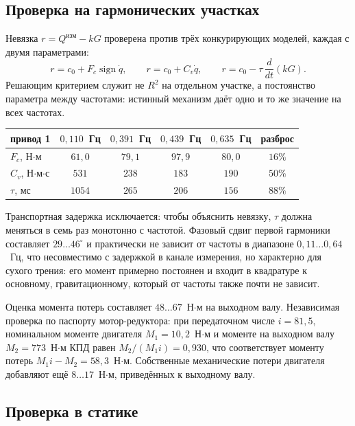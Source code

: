 \subsection{Проверка на гармонических участках}

Невязка $r = Q^{\text{изм}} - kG$ проверена против трёх конкурирующих моделей, каждая с двумя параметрами:
\begin{equation}
r = c_0 + F_c\operatorname{sign}\dot{q}, \qquad
r = c_0 + C_v\dot{q}, \qquad
r = c_0 - \tau\,\frac{d}{dt}\left(kG\right).
\end{equation}
Решающим критерием служит не $R^2$ на отдельном участке, а постоянство параметра между частотами: истинный механизм даёт одно и то же значение на всех частотах.

\begin{center}
\begin{tabular}{l|cccc|c}
привод 1 & $0{,}110$~Гц & $0{,}391$~Гц & $0{,}439$~Гц & $0{,}635$~Гц & разброс\\
\hline
$F_c$, Н$\cdot$м & $61{,}0$ & $79{,}1$ & $97{,}9$ & $80{,}0$ & $16\%$\\
$C_v$, Н$\cdot$м$\cdot$с & $531$ & $238$ & $183$ & $190$ & $50\%$\\
$\tau$, мс & $1054$ & $265$ & $206$ & $156$ & $88\%$\\
\end{tabular}
\end{center}

Транспортная задержка исключается: чтобы объяснить невязку, $\tau$ должна меняться в семь раз монотонно с частотой. Фазовый сдвиг первой гармоники составляет $29\ldots46^{\circ}$ и практически не зависит от частоты в диапазоне $0{,}11\ldots0{,}64$~Гц, что несовместимо с задержкой в канале измерения, но характерно для сухого трения: его момент примерно постоянен и входит в квадратуре к основному, гравитационному, который от частоты также почти не зависит.

Оценка момента потерь составляет $48\ldots67$~Н$\cdot$м на выходном валу. Независимая проверка по паспорту мотор-редуктора: при передаточном числе $i = 81{,}5$, номинальном моменте двигателя $M_1 = 10{,}2$~Н$\cdot$м и моменте на выходном валу $M_2 = 773$~Н$\cdot$м КПД равен $M_2/(M_1 i) = 0{,}930$, что соответствует моменту потерь $M_1 i - M_2 = 58{,}3$~Н$\cdot$м. Собственные механические потери двигателя добавляют ещё $8\ldots17$~Н$\cdot$м, приведённых к выходному валу.

\subsection{Проверка в статике}


